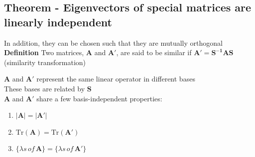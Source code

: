 \documentclass[a4paper, 11pt, normalem]{report}
\begin{document}
\subsection{Theorem - Eigenvectors of special matrices are linearly independent}
In addition, they can be chosen such that they are mutually orthogonal
\vspace{-15pt}
\textbf{Definition}
Two matrices, $\mathbf{A}$ and $\mathbf{A}'$, are said to be similar if $\mathbf{A}' = \mathbf{S^{-1}AS}$ (similarity transformation)

$\mathbf{A}$ and $\mathbf{A}'$ represent the same linear operator in different bases \\
These bases are related by $\mathbf{S}$ \\
$\mathbf{A}$ and $\mathbf{A}'$ share a few basis-independent properties:
\begin{enumerate}
    \item $\mathbf{|A|} = \mathbf{|A'|}$
    \item $\text{Tr}(\mathbf{A}) = \text{Tr}(\mathbf{A'})$
    \item $\{\lambda s \,of\, \mathbf{A}\} = \{ \lambda s \,of\, \mathbf{A}'\}$
\end{enumerate}
\end{document}
